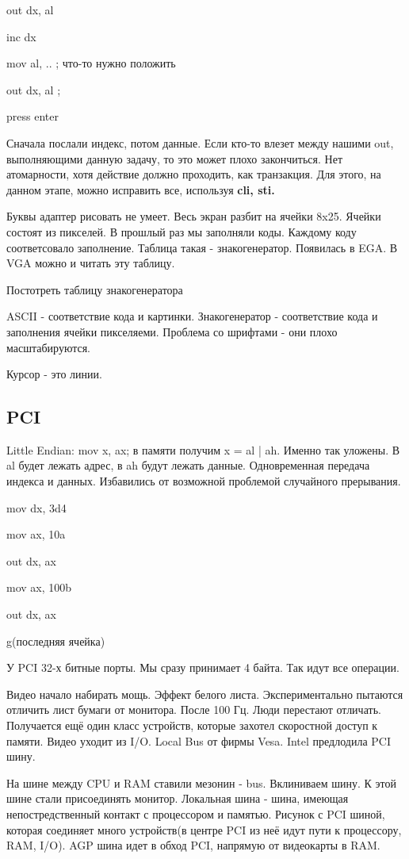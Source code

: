 out dx, al

inc dx

mov al, .. ; что-то нужно положить

out dx, al ;

press enter



Сначала послали индекс, потом данные. Если кто-то влезет между нашими out, выполняющими данную задачу, то это может плохо закончиться. Нет атомарности, хотя действие должно проходить, как транзакция. Для этого, на данном этапе, можно исправить все, используя \bfseries cli, sti.\mdseries

Буквы адаптер рисовать не умеет. Весь экран разбит на ячейки 8x25. Ячейки состоят из пикселей. В прошлый раз мы заполняли коды. Каждому коду соответсовало заполнение. Таблица такая - знакогенератор. Появилась в EGA. В VGA можно и читать эту таблицу.
\begin{hw}Постотреть таблицу знакогенератора\end{hw}
ASCII - соответствие кода и картинки. Знакогенератор - соответствие кода и заполнения ячейки пикселяеми. Проблема со шрифтами - они плохо масштабируются.

Курсор - это линии.

\subsection{PCI}
Little Endian: mov x, ax; в памяти получим x = al | ah. Именно так уложены. В al будет лежать адрес, в ah будут лежать данные. Одновременная передача индекса и данных. Избавились от возможной проблемой случайного прерывания. 

mov dx, 3d4

mov ax, 10a

out dx, ax

mov ax, 100b

out dx, ax

g(последняя ячейка)

У PCI 32-х битные порты. Мы сразу принимает 4 байта. Так идут все операции. 

Видео начало набирать мощь. Эффект белого листа. Экспериментально пытаются отличить лист бумаги от монитора. После 100 Гц. Люди перестают отличать. 
Получается ещё один класс устройств, которые захотел скоростной доступ к памяти. Видео уходит из I/O. Local Bus от фирмы Vesa. Intel предлодила PCI шину.

На шине между CPU и RAM ставили мезонин - bus. Вклиниваем шину. К этой шине стали присоединять монитор. Локальная шина - шина, имеющая непостредственный контакт с процессором и памятью. Рисунок с PCI шиной, которая соединяет много устройств(в центре PCI из неё идут пути к процессору, RAM, I/O). AGP шина идет в обход PCI, напрямую от видеокарты в RAM.

